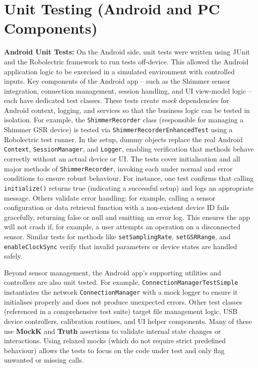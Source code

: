 \section{Unit Testing (Android and PC Components)}
\label{sec:unit-testing}
\textbf{Android Unit Tests:} On the Android side, unit tests were written using JUnit and the Robolectric framework to run tests off-device. This allowed the Android application logic to be exercised in a simulated environment with controlled inputs. Key components of the Android app -- such as the Shimmer sensor integration, connection management, session handling, and UI view-model logic -- each have dedicated test classes. These tests create \emph{mock} dependencies for Android context, logging, and services so that the business logic can be tested in isolation. For example, the \texttt{ShimmerRecorder} class (responsible for managing a Shimmer GSR device) is tested via \texttt{ShimmerRecorderEnhancedTest} using a Robolectric test runner. In the setup, dummy objects replace the real Android \texttt{Context}, \texttt{SessionManager}, and \texttt{Logger}, enabling verification that methods behave correctly without an actual device or UI. The tests cover initialisation and all major methods of \texttt{ShimmerRecorder}, invoking each under normal and error conditions to ensure robust behaviour. For instance, one test confirms that calling \texttt{initialize()} returns true (indicating a successful setup) and logs an appropriate message. Others validate error handling: for example, calling a sensor configuration or data retrieval function with a non-existent device ID fails gracefully, returning false or null and emitting an error log. This ensures the app will not crash if, for example, a user attempts an operation on a disconnected sensor. Similar tests for methods like \texttt{setSamplingRate}, \texttt{setGSRRange}, and \texttt{enableClockSync} verify that invalid parameters or device states are handled safely.

Beyond sensor management, the Android app's supporting utilities and controllers are also unit tested. For example, \texttt{ConnectionManagerTestSimple} instantiates the network \texttt{ConnectionManager} with a mock logger to ensure it initialises properly and does not produce unexpected errors. Other test classes (referenced in a comprehensive test suite) target file management logic, USB device controllers, calibration routines, and UI helper components. Many of these use \textbf{MockK} and \textbf{Truth} assertions to validate internal state changes or interactions. Using relaxed mocks (which do not require strict predefined behaviour) allows the tests to focus on the code under test and only flag unwanted or missing calls.

